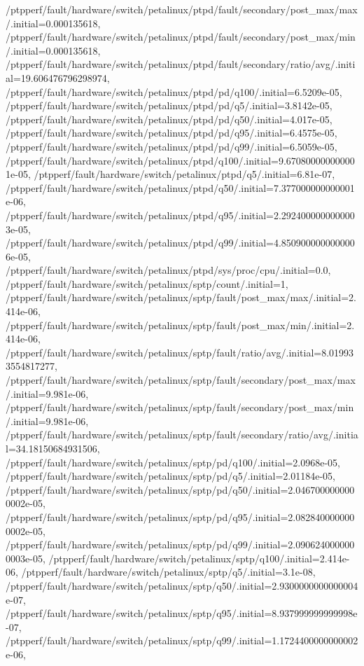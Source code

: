 {    /ptpperf/fault/hardware/switch/petalinux/ptpd/fault/secondary/post_max/max/.initial=0.000135618,
    /ptpperf/fault/hardware/switch/petalinux/ptpd/fault/secondary/post_max/min/.initial=0.000135618,
    /ptpperf/fault/hardware/switch/petalinux/ptpd/fault/secondary/ratio/avg/.initial=19.606476796298974,
    /ptpperf/fault/hardware/switch/petalinux/ptpd/pd/q100/.initial=6.5209e-05,
    /ptpperf/fault/hardware/switch/petalinux/ptpd/pd/q5/.initial=3.8142e-05,
    /ptpperf/fault/hardware/switch/petalinux/ptpd/pd/q50/.initial=4.017e-05,
    /ptpperf/fault/hardware/switch/petalinux/ptpd/pd/q95/.initial=6.4575e-05,
    /ptpperf/fault/hardware/switch/petalinux/ptpd/pd/q99/.initial=6.5059e-05,
    /ptpperf/fault/hardware/switch/petalinux/ptpd/q100/.initial=9.670800000000001e-05,
    /ptpperf/fault/hardware/switch/petalinux/ptpd/q5/.initial=6.81e-07,
    /ptpperf/fault/hardware/switch/petalinux/ptpd/q50/.initial=7.377000000000001e-06,
    /ptpperf/fault/hardware/switch/petalinux/ptpd/q95/.initial=2.2924000000000003e-05,
    /ptpperf/fault/hardware/switch/petalinux/ptpd/q99/.initial=4.8509000000000006e-05,
    /ptpperf/fault/hardware/switch/petalinux/ptpd/sys/proc/cpu/.initial=0.0,
    /ptpperf/fault/hardware/switch/petalinux/sptp/count/.initial=1,
    /ptpperf/fault/hardware/switch/petalinux/sptp/fault/post_max/max/.initial=2.414e-06,
    /ptpperf/fault/hardware/switch/petalinux/sptp/fault/post_max/min/.initial=2.414e-06,
    /ptpperf/fault/hardware/switch/petalinux/sptp/fault/ratio/avg/.initial=8.019933554817277,
    /ptpperf/fault/hardware/switch/petalinux/sptp/fault/secondary/post_max/max/.initial=9.981e-06,
    /ptpperf/fault/hardware/switch/petalinux/sptp/fault/secondary/post_max/min/.initial=9.981e-06,
    /ptpperf/fault/hardware/switch/petalinux/sptp/fault/secondary/ratio/avg/.initial=34.18150684931506,
    /ptpperf/fault/hardware/switch/petalinux/sptp/pd/q100/.initial=2.0968e-05,
    /ptpperf/fault/hardware/switch/petalinux/sptp/pd/q5/.initial=2.01184e-05,
    /ptpperf/fault/hardware/switch/petalinux/sptp/pd/q50/.initial=2.0467000000000002e-05,
    /ptpperf/fault/hardware/switch/petalinux/sptp/pd/q95/.initial=2.0828400000000002e-05,
    /ptpperf/fault/hardware/switch/petalinux/sptp/pd/q99/.initial=2.0906240000000003e-05,
    /ptpperf/fault/hardware/switch/petalinux/sptp/q100/.initial=2.414e-06,
    /ptpperf/fault/hardware/switch/petalinux/sptp/q5/.initial=3.1e-08,
    /ptpperf/fault/hardware/switch/petalinux/sptp/q50/.initial=2.9300000000000004e-07,
    /ptpperf/fault/hardware/switch/petalinux/sptp/q95/.initial=8.937999999999998e-07,
    /ptpperf/fault/hardware/switch/petalinux/sptp/q99/.initial=1.1724400000000002e-06,
}
